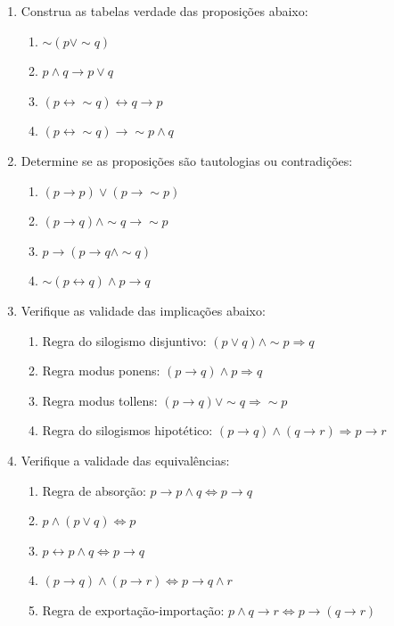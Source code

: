 \documentclass[a4paper,5pt]{amsbook}
\newcommand{\ra}{\rightarrow}
\newcommand{\lra}{\leftrightarrow}
\newcommand{\Ra}{\Rightarrow}
\newcommand{\LRa}{\Leftrightarrow}
\renewcommand{\lnot}{\sim}
\begin{document}
\vspace{1cm}
\begin{enumerate}
    \vspace{0.5cm}
    \item Construa as tabelas verdade das proposi\c{c}\~oes abaixo:
        \begin{enumerate}
            \item $\lnot(p\lor \lnot q)$
            \item $p\land q \ra p\lor q$
            \item $(p\lra \lnot q)\lra q \ra p$
            \item $(p\lra \lnot q) \ra \lnot p \land q$
        \end{enumerate}

    \vspace{0.5cm}
    \item Determine se as proposi\c{c}\~oes s\~ao tautologias ou contradi\c{c}\~oes:
        \begin{enumerate}
            \item $(p\ra p) \lor (p\ra \lnot p)$
            \item $(p\ra q) \land \lnot q \ra \lnot p$
            \item $p\ra (p\ra q \land \lnot q)$
            \item $\lnot(p \lra q) \land p \ra q$
        \end{enumerate}

    \vspace{0.5cm}
    \item Verifique as validade das implica\c{c}\~oes abaixo:
        \begin{enumerate}
            \item Regra do silogismo disjuntivo: $(p\lor q)\land \lnot p \Ra q$
            \item Regra modus ponens: $(p\ra q)\land p \Ra q$
            \item Regra modus tollens: $(p\ra q) \lor \lnot q \Ra \lnot p$
            \item Regra do silogismos hipot\'etico: $(p\ra q)\land(q\ra r)\Ra p\ra r$
        \end{enumerate}

    \vspace{0.5cm}
    \item Verifique a validade das equival\^encias:
        \begin{enumerate}
            \item Regra de absor\c{c}\~ao: $p\ra p\land q \LRa p\ra q$
            \item $p\land(p\lor q)\LRa p$
            \item $p\lra p\land q \LRa p\ra q$
            \item $(p\ra q)\land(p\ra r)\LRa p\ra q\land r$
            \item Regra de exporta\c{c}\~ao-importa\c{c}\~ao: $p\land q \ra r\LRa p\ra(q\ra r)$
        \end{enumerate}


\end{enumerate}
\end{document}
